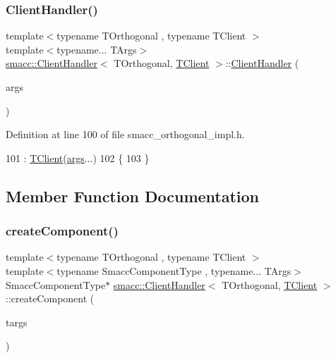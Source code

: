 \subsubsection{\texorpdfstring{Client\+Handler()}{ClientHandler()}}
{\footnotesize\ttfamily template$<$typename T\+Orthogonal , typename T\+Client $>$ \\
template$<$typename... T\+Args$>$ \\
\hyperlink{classsmacc_1_1ClientHandler}{smacc\+::\+Client\+Handler}$<$ T\+Orthogonal, \hyperlink{classTClient}{T\+Client} $>$\+::\hyperlink{classsmacc_1_1ClientHandler}{Client\+Handler} (\begin{DoxyParamCaption}\item[{T\+Args...}]{args }\end{DoxyParamCaption})\hspace{0.3cm}{\ttfamily [inline]}}



Definition at line 100 of file smacc\+\_\+orthogonal\+\_\+impl.\+h.


\begin{DoxyCode}
101         : \hyperlink{classTClient}{TClient}(\hyperlink{namespacegenerate__debs_a75f9143e38df82d83b2e8a6f99cae02c}{args}...)
102     \{
103     \}
\end{DoxyCode}


\subsection{Member Function Documentation}
\mbox{\label{classsmacc_1_1ClientHandler_a4a9adad4c37104586c9b595d9030bb3c}} 
\subsubsection{\texorpdfstring{create\+Component()}{createComponent()}}
{\footnotesize\ttfamily template$<$typename T\+Orthogonal , typename T\+Client $>$ \\
template$<$typename Smacc\+Component\+Type , typename... T\+Args$>$ \\
Smacc\+Component\+Type$\ast$ \hyperlink{classsmacc_1_1ClientHandler}{smacc\+::\+Client\+Handler}$<$ T\+Orthogonal, \hyperlink{classTClient}{T\+Client} $>$\+::create\+Component (\begin{DoxyParamCaption}\item[{T\+Args...}]{targs }\end{DoxyParamCaption})\hspace{0.3cm}{\ttfamily [inline]}}



